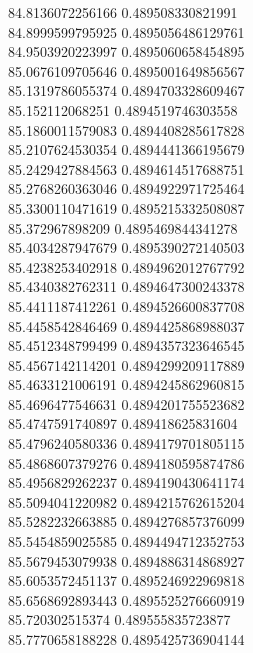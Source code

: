 {84.8136072256166 0.489508330821991
 \\
84.8999599795925 0.4895056486129761
 \\
84.9503920223997 0.4895060658454895
 \\
85.0676109705646 0.4895001649856567
 \\
85.1319786055374 0.4894703328609467
 \\
85.152112068251 0.4894519746303558
 \\
85.1860011579083 0.4894408285617828
 \\
85.2107624530354 0.4894441366195679
 \\
85.2429427884563 0.4894614517688751
 \\
85.2768260363046 0.4894922971725464
 \\
85.3300110471619 0.4895215332508087
 \\
85.372967898209 0.4895469844341278
 \\
85.4034287947679 0.4895390272140503
 \\
85.4238253402918 0.4894962012767792
 \\
85.4340382762311 0.4894647300243378
 \\
85.4411187412261 0.4894526600837708
 \\
85.4458542846469 0.4894425868988037
 \\
85.4512348799499 0.4894357323646545
 \\
85.4567142114201 0.4894299209117889
 \\
85.4633121006191 0.4894245862960815
 \\
85.4696477546631 0.4894201755523682
 \\
85.4747591740897 0.489418625831604
 \\
85.4796240580336 0.4894179701805115
 \\
85.4868607379276 0.4894180595874786
 \\
85.4956829262237 0.4894190430641174
 \\
85.5094041220982 0.4894215762615204
 \\
85.5282232663885 0.4894276857376099
 \\
85.5454859025585 0.4894494712352753
 \\
85.5679453079938 0.4894886314868927
 \\
85.6053572451137 0.4895246922969818
 \\
85.6568692893443 0.4895525276660919
 \\
85.720302515374 0.489555835723877
 \\
85.7770658188228 0.4895425736904144
 \\
}
